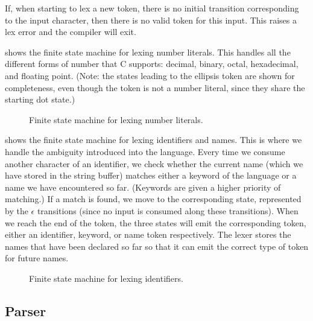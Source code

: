 \documentclass[00-main.tex]{subfiles}
\begin{document}
If, when starting to lex a new token, there is no initial transition corresponding to the input character, then there is no valid token for this input. This raises a lex error and the compiler will exit.

 shows the finite state machine for lexing number literals. This handles all the different forms of number that C supports: decimal, binary, octal, hexadecimal, and floating point.
(Note: the states leading to the ellipsis token are shown for completeness, even though the token is not a number literal, since they share the starting dot state.)

\begin{figure}[t]
  \centering
  \caption{Finite state machine for lexing number literals.}
  \label{fig:lexing numbers fsm} %
\end{figure}

 shows the finite state machine for lexing identifiers and  names.
This is where we handle the ambiguity introduced into the language.
  Every time we consume another character of an identifier, we check whether the current name (which we have stored in the string buffer) matches either a keyword of the language or a  name we have encountered so far.
(Keywords are given a higher priority of matching.)
  If a match is found, we move to the corresponding state, represented by the $\epsilon$ transitions (since no input is consumed along these transitions).
When we reach the end of the token, the three states will emit the corresponding token, either an identifier, keyword, or  name token respectively.
The lexer stores the  names that have been declared so far so that it can emit the correct type of token for future names.

\begin{figure}[t]
  \centering
  \caption{Finite state machine for lexing identifiers.}
  \label{fig:lexing identifiers fsm} %
\end{figure}


\subsection{Parser}
\end{document}
